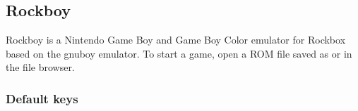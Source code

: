 \subsection{Rockboy}
\label{ref:Rockboy}
Rockboy is a Nintendo Game Boy and Game Boy Color emulator for Rockbox based on
the gnuboy emulator. To start a game, open a ROM file saved as  or
 in the file browser.\\


\subsubsection{Default keys}
